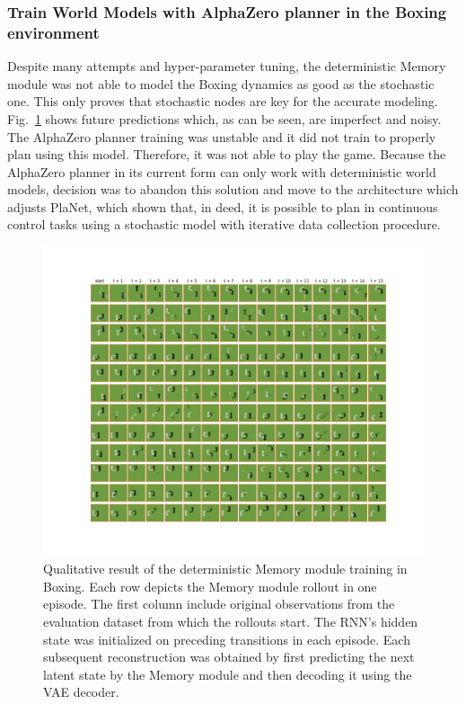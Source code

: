 \subsubsection{Train World Models with AlphaZero planner in the Boxing environment}

Despite many attempts and hyper-parameter tuning, the deterministic Memory module was not able to model the Boxing dynamics as good as the stochastic one. This only proves that stochastic nodes are key for the accurate modeling. Fig.~\ref{Fig.WM_Boxing_deterministic_memory} shows future predictions which, as can be seen, are imperfect and noisy. The AlphaZero planner training was unstable and it did not train to properly plan using this model. Therefore, it was not able to play the game. Because the AlphaZero planner in its current form can only work with deterministic world models, decision was to abandon this solution and move to the architecture which adjusts PlaNet, which shown that, in deed, it is possible to plan in continuous control tasks using a stochastic model with iterative data collection procedure.

\begin{figure}[H]
\includegraphics[width=1\textwidth,keepaspectratio]{figures/Boxing_deterministic_memory.JPG}
\caption[Qualitative result of the World Models' deterministic Memory module training in Boxing]{Qualitative result of the deterministic Memory module training in Boxing. Each row depicts the Memory module rollout in one episode. The first column include original observations from the evaluation dataset from which the rollouts start. The RNN's hidden state was initialized on preceding transitions in each episode. Each subsequent reconstruction was obtained by first predicting the next latent state by the Memory module and then decoding it using the VAE decoder.}
\label{Fig.WM_Boxing_deterministic_memory}
\end{figure}

